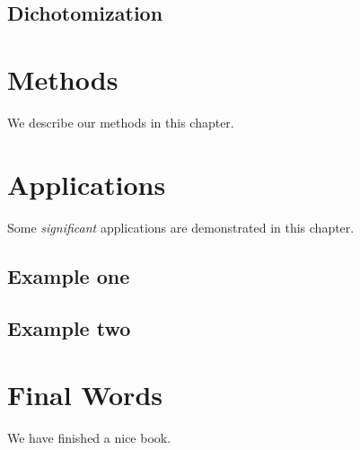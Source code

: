 \documentclass[
]{book}
\begin{document}
\hypertarget{dichotomization}{%
\section{Dichotomization}\label{dichotomization}}

\hypertarget{methods}{%
\chapter{Methods}\label{methods}}

We describe our methods in this chapter.

\hypertarget{applications}{%
\chapter{Applications}\label{applications}}

Some \emph{significant} applications are demonstrated in this chapter.

\hypertarget{example-one}{%
\section{Example one}\label{example-one}}

\hypertarget{example-two}{%
\section{Example two}\label{example-two}}

\hypertarget{final-words}{%
\chapter{Final Words}\label{final-words}}

We have finished a nice book.

  
\end{document}
